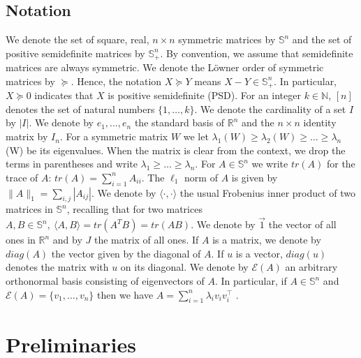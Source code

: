 \documentclass{article}
\begin{document}
\subsection{Notation}
 We denote the set of square, real,  $n\times n$ symmetric matrices by $\mathbb{S}^n$ and the set of positive semidefinite matrices by $\mathbb{S}^n_+$. By convention, we assume that semidefinite matrices are always symmetric. We denote the L\"{o}wner order of symmetric matrices by $\succeq$. Hence, the notation 
$X \succeq Y$ means $X-Y \in \mathbb{S}^n_+$. In particular, $X\succeq 0$ indicates that $X$ is positive semidefinite (PSD). For an integer $k \in \mathbb{N}$, $[n]$ denotes the set of natural numbers $\{1,\dots,k\}$.
We denote the cardinality of a set $I$ by $|I|$.
We denote by $e_1,\dots, e_n$ the standard basis of $\mathbb{R}^n$ and the $n\times n$ identity matrix by $I_n$. For a symmetric matrix $W$ we let $\lambda_1(W) \geq \lambda_2(W) \geq \dots \geq \lambda_n$(W) be its eigenvalues. When the matrix is clear from the context, we drop the terms in parentheses and write $\lambda_1\geq\dots\geq\lambda_n$. For $A \in \mathbb{S}^n$ we write $tr(A)$ for the trace of $A$: $tr(A) = \sum_{i=1}^nA_{ii}$. The $\ell_1$ norm of $A$ is given by $\|A\|_1 = \sum_{i,j}|A_{ij}|$. We denote by $\langle\cdot,\cdot\rangle$ the usual Frobenius inner product of two matrices in $\mathbb{S}^n$, recalling that for two matrices $A,B \in \mathbb{S}^n, \ \langle A,B\rangle = tr(A^TB)=tr(AB)$.
We denote by $\Vec{1}$ the vector of all ones in $\mathbb{R}^n$ and by $J$ the matrix of all ones. If $A$ is a matrix, we denote by $diag(A)$ the vector given by the diagonal of $A$. If $u$ is a vector, $diag(u)$ denotes the matrix with $u$ on its diagonal. We
denote by $\mathcal{E}(A)$ an arbitrary orthonormal basis consisting of eigenvectors of $A$. In particular, if $A \in \mathbb{S}^n$ and $\mathcal{E}(A) = \{v_1,\dots,v_n\}$ then we have $A = \sum_{i=1}^n \lambda_iv_iv_i^\top$ \cite{horn2012matrix}.



\section{Preliminaries}
\label{sec:preliminaries}
\end{document}
